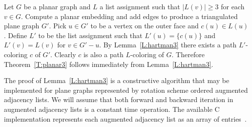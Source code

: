 \documentclass[12pt,letterpaper]{article}
\theoremstyle{plain}
\theoremstyle{definition}
\theoremstyle{break}
\begin{document}
Let $G$ be a planar graph and $L$ a list assignment such
that $|L(v)|\ge 3$ for each $v\in G$. Compute a planar embedding and add edges
to produce a triangulated plane graph $G'$. Pick $u\in G'$ to be a vertex
on the outer face and $c(u)\in L(u)$. Define $L'$ to be the list
assignment such that $L'(u)=\{c(u)\}$ and $L'(v)=L(v)$ for $v\in G'-u$.
By Lemma~\ref{L:hartman3} there exists a path $L'$-coloring $c$ of $G'$.
Clearly $c$ is also a path $L$-coloring of $G$.
Therefore Theorem~\ref{T:planar3} follows immediately from 
Lemma~\ref{L:hartman3}.

The proof of Lemma~\ref{L:hartman3} is a constructive algorithm that may be
implemented for plane graphs represented by
rotation scheme ordered augmented adjacency lists.
We will assume that both forward and backward iteration in augmented adjacency
lists
is a constant time operation.
The
available C implementation represents each augmented adjacency list as an array
of entries~\cite{Bro2017}.


%
% 
%
\end{document}
